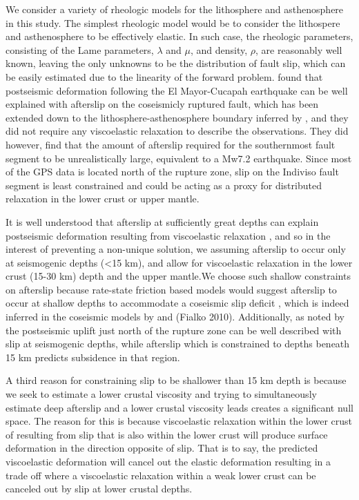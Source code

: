 \documentclass[12pt]{article}
\begin{document}
We consider a variety of rheologic models for the lithosphere and asthenosphere in this study.  The simplest rheologic model would be to consider the lithospere and asthenosphere to be effectively elastic. In such case, the rheologic parameters, consisting of the Lame parameters, $\lambda$ and $\mu$, and density, $\rho$, are reasonably well known, leaving the only unknowns to be the distribution of fault slip, which can be easily estimated due to the linearity of the forward problem. \cite{Rollins2015} found that postseismic deformation following the El Mayor-Cucapah earthquake can be well explained with afterslip on the coseismicly ruptured fault, which has been extended down to the lithosphere-asthenosphere boundary inferred by \cite{Lekic2011}, and they did not require any viscoelastic relaxation to describe the observations.  They did however, find that the amount of afterslip required for the southernmost fault segment to be unrealistically large, equivalent to a Mw7.2 earthquake.  Since most of the GPS data is located north of the rupture zone, slip on the Indiviso fault segment is least constrained and could be acting as a proxy for distributed relaxation in the lower crust or upper mantle. 

It is well understood that afterslip at sufficiently great depths can explain postseismic deformation resulting from viscoelastic relaxation \cite{Savage1990}, and so in the interest of preventing a non-unique solution, we assuming afterslip to occur only at seismogenic depths (<15 km), and allow for viscoelastic relaxation in the lower crust (15-30 km) depth and the upper mantle.We choose such shallow constraints on afterslip because rate-state friction based models would suggest afterslip to occur at shallow depths to accommodate a coseismic slip deficit \cite{Marone1991}, which is indeed inferred in the coseismic models by \cite{Wei2011a} and (Fialko 2010). Additionally, as noted by \cite{Rollins2015} the postseismic uplift just north of the rupture zone can be well described with slip at seismogenic depths, while afterslip which is constrained to depths beneath 15 km predicts subsidence in that region.  

A third reason for constraining slip to be shallower than 15 km depth is because we seek to estimate a lower crustal viscosity and trying to simultaneously estimate deep afterslip and a lower crustal viscosity leads creates a significant null space.  The reason for this is because viscoelastic relaxation within the lower crust of resulting from slip that is also within the lower crust will produce surface deformation in the direction opposite of slip. That is to say, the predicted viscoelastic deformation will cancel out the elastic deformation resulting in a trade off where a viscoelastic relaxation within a weak lower crust can be canceled out by slip at lower crustal depths.      
\end{document}
